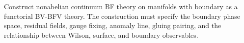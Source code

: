 \begin{openproblem}
\label{op:continuum-bf-boundaries}
Construct nonabelian continuum BF theory on manifolds with boundary as a
functorial BV-BFV theory.  The construction must specify the boundary phase
space, residual fields, gauge fixing, anomaly line, gluing pairing, and the
relationship between Wilson, surface, and boundary observables.
\end{openproblem}
